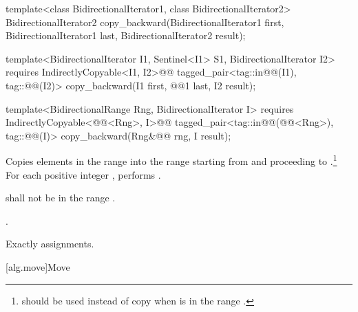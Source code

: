 %
\begin{removedblock}
\begin{itemdecl}
template<class BidirectionalIterator1, class BidirectionalIterator2>
  BidirectionalIterator2
    copy_backward(BidirectionalIterator1 first,
                  BidirectionalIterator1 last,
                  BidirectionalIterator2 result);
\end{itemdecl}
\end{removedblock}
\begin{addedblock}
\begin{itemdecl}
template<BidirectionalIterator I1, Sentinel<I1> S1, BidirectionalIterator I2>
  requires IndirectlyCopyable<I1, I2>@\newtxt{()}@
  tagged_pair<tag::in@@(I1), tag::@@(I2)>
    copy_backward(I1 first, @@1 last, I2 result);

template<BidirectionalRange Rng, BidirectionalIterator I>
  requires IndirectlyCopyable<@@<Rng>, I>@\newtxt{()}@
  tagged_pair<tag::in@@(@@<Rng>), tag::@@(I)>
    copy_backward(Rng&@\newtxt{\&}@ rng, I result);
\end{itemdecl}
\end{addedblock}

\begin{itemdescr}
\pnum
\effects
Copies elements in the range 
into the
range 
starting from
and proceeding to .\footnote{
should be used instead of copy when 
is in
the range
.}
For each positive integer
,
performs
.

\pnum
\requires
{}
shall not be in the range
.

\pnum
\returns
{}.

\pnum
\complexity
Exactly
assignments.
\end{itemdescr}

[alg.move]{Move}

